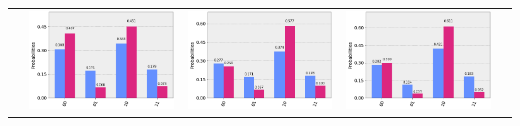 \documentclass[11pt]{article}
\begin{document}
\begin{table}[h!]
\begin{tabular}{| c | c | c | c | c | }
\begin{minipage}{.215\textwidth}
    \end{minipage}&
    \begin{minipage}{.215\textwidth}
    \includegraphics[width=\linewidth]{img/rand_qecc3_Y10.png}
    \end{minipage}
    &\begin{minipage}{.215\textwidth}
    \includegraphics[width=\linewidth]{img/rand_qecc3_Z10.png}
    \end{minipage}
    &\begin{minipage}{.215\textwidth}
    \includegraphics[width=\linewidth]{img/rand_qecc3_I10.png}

\end{minipage}
\end{tabular}
\end{table}
\end{document}
